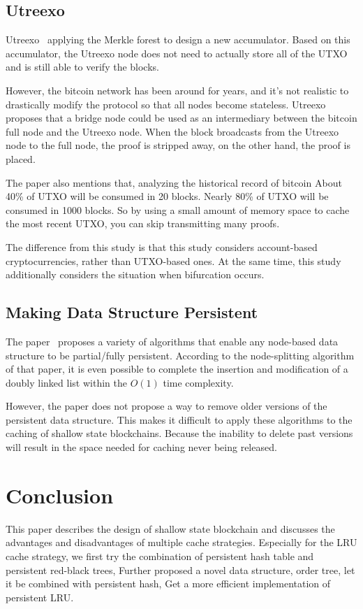 \documentclass[conference]{IEEEtran}
\begin{document}
\subsection{Utreexo}
Utreexo~\cite{b1} applying the Merkle forest to  design a new accumulator.
Based on this accumulator, the Utreexo node does not need to actually store all of the UTXO and is still able to verify the blocks.

However, the bitcoin network has been around for years, and it's not realistic to drastically modify the protocol so that all nodes become stateless.
Utreexo proposes that a bridge node could be used as an intermediary between the bitcoin full node and the Utreexo node.
When the block broadcasts from the Utreexo node to the full node, the proof is stripped away, on the other hand, the proof is placed.

The paper also mentions that, analyzing the historical record of bitcoin
About 40\% of UTXO will be consumed in 20 blocks.
Nearly 80\% of UTXO will be consumed in 1000 blocks.
So by using a small amount of memory space to cache the most recent UTXO, you can skip transmitting many proofs.

The difference from this study is that this study considers account-based cryptocurrencies, rather than UTXO-based ones.
At the same time, this study additionally considers the situation when bifurcation occurs.

\subsection{Making Data Structure Persistent}

The paper~\cite{b2} proposes a variety of algorithms that enable any node-based data structure to be partial/fully persistent.
According to the node-splitting algorithm of that paper, it is even possible to complete the insertion and modification of a doubly linked list within the $O(1)$ time complexity.

However, the paper does not propose a way to remove older versions of the persistent data structure.
This makes it difficult to apply these algorithms to the caching of shallow state blockchains.
Because the inability to delete past versions will result in the space needed for caching never being released.

\section{Conclusion}
This paper describes the design of shallow state blockchain and discusses the advantages and disadvantages of multiple cache strategies.
Especially for the LRU cache strategy, 
we first try the combination of persistent hash table and persistent red-black trees,
Further proposed a novel data structure, order tree, let it be combined with persistent hash,
Get a more efficient implementation of persistent LRU.
\end{document}
